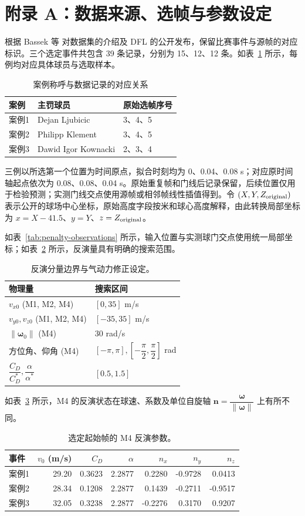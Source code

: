 \documentclass[12pt,letterpaper]{article}
\newcommand{\MFourParameterTable}{\begin{table}[H]\centering\small
\caption{选定起始帧的 M4 反演参数。}\label{tab:m4-parameters}
\setlength{\tabcolsep}{4pt}\begin{tabular}{lrrrrrr}\toprule
事件 & $v_0$ (m/s) & $C_D$ & $\alpha$ & $n_x$ & $n_y$ & $n_z$\\\midrule
案例1 & 29.20 & 0.3623 & 2.2877 & 0.2280 & -0.9728 & 0.0413\\
案例2 & 28.34 & 0.1208 & 2.2877 & 0.1439 & -0.2711 & -0.9517\\
案例3 & 32.05 & 0.3238 & 2.2877 & -0.2276 & 0.3170 & 0.9207\\
\bottomrule\end{tabular}\end{table}}
\newcommand{\InverseBoundsTable}{\begin{table}[H]\centering\footnotesize
\caption{反演分量边界与气动力修正设定。}\label{tab:inverse-bounds}
\setlength{\tabcolsep}{4pt}\begin{tabular}{ll}\toprule
物理量 & 搜索区间\\\midrule
$v_{x0}$ (M1, M2, M4) & $[0,35]$ m/s\\
$v_{y0},v_{z0}$ (M1, M2, M4) & $[-35,35]$ m/s\\
$\|\boldsymbol\omega_0\|$ (M4) & $30$ rad/s\\
方位角、仰角 (M4) & $[-\pi,\pi],[-\dfrac{\pi}{2},\dfrac{\pi}{2}]$ rad\\
$\dfrac{C_D}{C_D^*},\dfrac{\alpha}{\alpha^*}$ & $[0.5,1.5]$\\
\bottomrule\end{tabular}\end{table}}
\begin{document}
\newpage\section*{附录 A：数据来源、选帧与参数设定}\label{app:data}
\begingroup\def\small{\fontsize{10}{11}\selectfont}\small\setlength{\intextsep}{3pt}\captionsetup{font=small,skip=3pt}\renewcommand{\arraystretch}{.95}
根据 Bassek 等\cite{bassek} 对数据集的介绍及 DFL 的公开发布\cite{dataset}，保留比赛事件与源帧的对应标识。三个选定事件共包含 39 条记录，分别为 15、12、12 条。如表~\ref{tab:data-provenance} 所示，每例均对应具体球员与选取样本。
\begin{table}[H]\centering\small\caption{案例称呼与数据记录的对应关系}\label{tab:data-provenance}
\begin{tabular}{lll}\toprule
案例 & 主罚球员 & 原始选帧序号\\\midrule
案例1 & Dejan Ljubicic & 3、4、5\\
案例2 & Philipp Klement & 3、4、5\\
案例3 & Dawid Igor Kownacki & 2、3、4\\\bottomrule
\end{tabular}\end{table}
三例以所选第一个位置为时间原点，拟合时刻均为 0、0.04、0.08 s；对应原时间轴起点依次为 0.08、0.08、0.04 s。原始重复帧和门线后记录保留，后续位置仅用于检验预测；实测门线交点使用源帧或相邻帧线性插值得到。令 $(X,Y,Z_{\rm original})$ 表示公开的球场中心坐标，原始高度字段按米和球心高度解释，由此转换局部坐标为 $x=X-41.5$、$y=Y$、$z=Z_{\rm original}$。

如表~\ref{tab:penalty-observations} 所示，输入位置与实测球门交点使用统一局部坐标；如表~\ref{tab:inverse-bounds} 所示，反演量具有明确的搜索范围。

\InverseBoundsTable
如表~\ref{tab:m4-parameters} 所示，M4 的反演状态在球速、系数及单位自旋轴 $\boldsymbol n=\dfrac{\boldsymbol\omega}{\|\boldsymbol\omega\|}$ 上有所不同。
\MFourParameterTable



\endgroup
{}
\end{document}
